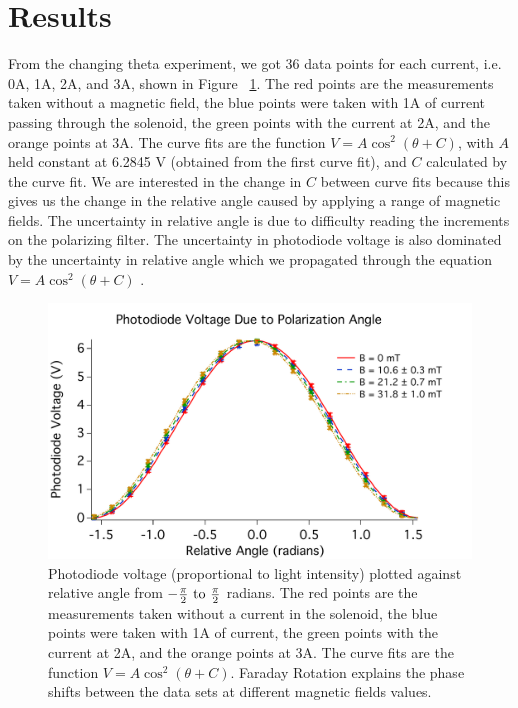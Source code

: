 \documentclass[prb,preprint]{revtex4-1}
\begin{document}
\section{Results}

From the changing theta experiment, we got 36 data points for each current, i.e. 0A, 1A, 2A, and 3A, shown in Figure ~\ref{V_ThetaRel_Plot}. The red points are the measurements taken without a magnetic field, the blue points were taken with 1A of current passing through the solenoid, the green points with the current at 2A, and the orange points at 3A.  The curve fits are the function $V = A \cos^{2}(\theta + C)$, with $A$ held constant at 6.2845 V (obtained from the first curve fit), and $C$ calculated by the curve fit. We are interested in the change in $C$ between curve fits because this gives us the change in the relative angle caused by applying a range of magnetic fields. The uncertainty in relative angle is due to difficulty reading the increments on the polarizing filter. The uncertainty in photodiode voltage is also dominated by the uncertainty in relative angle which we propagated through the equation $V = A \cos ^2 (\theta + C)$ .

\begin{figure}[h!]
\centering

\includegraphics[width=6in]{V_ThetaRel_Plot.pdf}
\caption{Photodiode voltage (proportional to light intensity) plotted against relative angle from $-\frac{\pi}{2} \rm{\ to\ } \frac{\pi}{2}$ radians.  The red points are the measurements taken without a current in the solenoid, the blue points were taken with 1A of current, the green points with the current at 2A, and the orange points at 3A.  The curve fits are the function $V = A \cos^{2}(\theta + C) $. Faraday Rotation explains the phase shifts between the data sets at different magnetic fields values.}

\label{V_ThetaRel_Plot}
\end{figure}
\end{document}
